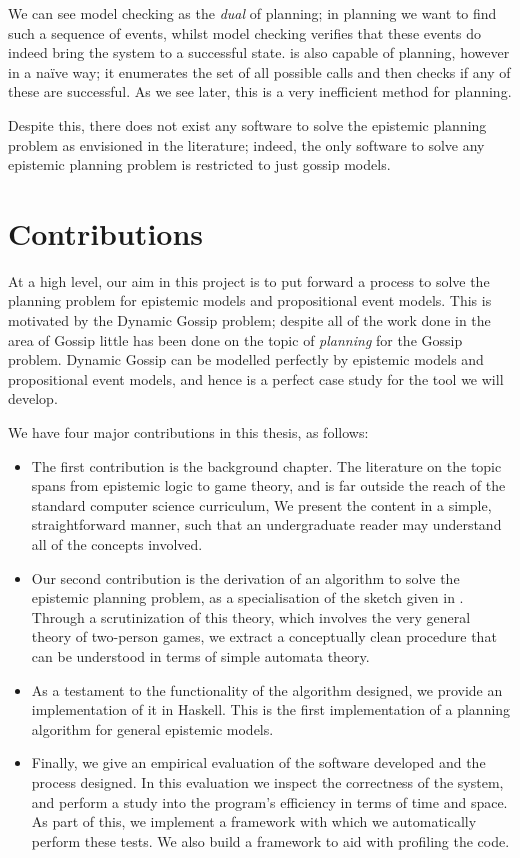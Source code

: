 \documentclass[10pt, a4paper]{report}
\begin{document}
We can see model checking as the \emph{dual} of planning; in planning we want
to find such a sequence of events, whilst model checking verifies that these
events do indeed bring the system to a successful state. \cite{GithubGossip} is
also capable of planning, however in a na{\"i}ve way; it enumerates the set of
all possible calls and then checks if any of these are successful. As we see
later, this is a very inefficient method for planning.  

Despite this, there does not exist any software to solve the epistemic planning
problem as envisioned in the literature; indeed, the only software to solve any
epistemic planning problem is restricted to just gossip models.

\section{Contributions}

At a high level, our aim in this project is to put forward a process to solve
the planning problem for epistemic models and propositional event models. This
is motivated by the Dynamic Gossip problem; despite all of the work done in the
area of Gossip little has been done on the topic of \emph{planning} for the
Gossip problem. Dynamic Gossip can be modelled perfectly by epistemic models and
propositional event models, and hence is a perfect case study for the tool we
will develop. 

We have four major contributions in this thesis, as follows:

\begin{itemize}
\item The first contribution is the background chapter. The literature on the
  topic spans from epistemic logic to game theory, and is far outside the reach
  of the standard computer science curriculum, We present the content in a
  simple, straightforward manner, such that an undergraduate reader may
  understand all of the concepts involved.
\item Our second contribution is the derivation of an algorithm to solve the
  epistemic planning problem, as a specialisation of the sketch given in
  \cite{AutomataTechniques}. Through a scrutinization of this theory, which
  involves the very general theory of two-person games, we extract a
  conceptually clean procedure that can be understood in terms of simple
  automata theory.
\item As a testament to the functionality of the algorithm designed, we provide
  an implementation of it in Haskell. This is the first implementation of a
  planning algorithm for general epistemic models. 
\item Finally, we give an empirical evaluation of the software developed and the
  process designed. In this evaluation we inspect the correctness of the system,
  and perform a study into the program's efficiency in terms of time and space.
  As part of this, we implement a framework with which we automatically perform
  these tests. We also build a framework to aid with profiling the code.
\end{itemize}
\end{document}
